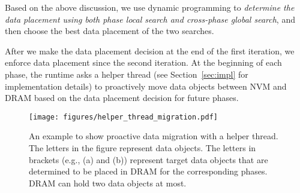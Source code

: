 
\begin{comment}
as well as a combination of all phases.
For a combination of all phases, once the optimal data placement is determined,
there is no data movement within the combination. Hence,
treating all phases as a combination, we minimize the data movement.
However, the optimal data placement for the combination of all phases does not necessarily result in the best performance for each individual phase.
Determining the data placement at the granularity of single phase
can lead to the optimal data placement for each phase, but result in more frequent data movement. If those extra data movement cannot be hidden,
then determining the data placement at the granularity of single phase (called ``local view'') may have worse performance than determining the data placement at the granularity of all phases (called ``global view'').
\end{comment}

Based on the above discussion, we use dynamic programming to
\textit{determine the data placement using both phase local search and cross-phase global search}, and then choose the best data placement of the two searches.

After we make the data placement decision at the end of the first iteration, we enforce data placement since the second iteration.
At the beginning of each phase, the runtime asks a helper thread (see Section~\ref{sec:impl} for implementation details)
to proactively move data objects between NVM and DRAM based on the data placement decision for future phases.

\begin{figure*}
  \centering
  \texttt{[image: figures/helper\_thread\_migration.pdf]}
  \caption{An example to show proactive data migration with a helper thread. The letters in the figure represent data objects. The letters in brackets (e.g., (a) and (b)) represent target data objects that are determined to be placed in DRAM for the corresponding phases. DRAM can hold two data objects at most.}
\label{fig:proactive_migration}
\end{figure*}

